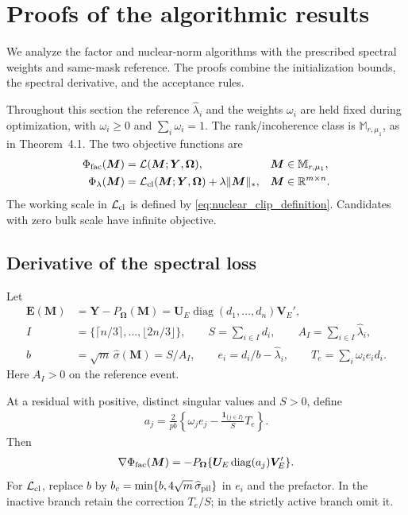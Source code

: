\documentclass[numsec,webpdf,modern,large,namedate]{oup-authoring-template}
\theoremstyle{plain}
\theoremstyle{remark}
\newcommand{\M}{\bm{M}}
\newcommand{\Y}{\bm{Y}}
\newcommand{\bOmega}{\bm{\Omega}}
\newcommand{\U}{\bm{U}}
\newcommand{\V}{\bm{V}}
\newif\ifmarkchanges
\newenvironment{revision}{\begingroup\ifmarkchanges\color{red}\fi}{\endgroup}
\begin{document}
\begin{revision}
\section{Proofs of the algorithmic results}
\label{sec:estimator_algorithms}

We analyze the factor and nuclear-norm algorithms with the prescribed
spectral weights and same-mask reference. The proofs combine the
initialization bounds, the spectral derivative, and the acceptance rules.

Throughout this section the reference $\widehat\lambda_i$ and the weights
$\omega_i$ are held fixed during optimization, with $\omega_i\ge0$ and
$\sum_i\omega_i=1$.  The rank/incoherence class is $\mathbb M_{r,\mu_1}$, as in Theorem~4.1.  The two objective functions are
\begin{align}
 \Phi_{\rm fac}(\M)&=\mathcal L(\M;\Y,\bOmega),
       &&\M\in\mathbb M_{r,\mu_1},\label{eq:of_factor_objective}\\
 \Phi_\lambda(\M)&=\mathcal L_{\rm cl}(\M;\Y,\bOmega)
                  +\lambda\|\M\|_*,
       &&\M\in\mathbb R^{m\times n}.\label{eq:of_nuclear_objective}
\end{align}
The working scale in $\mathcal L_{\rm cl}$ is defined by
\eqref{eq:nuclear_clip_definition}. Candidates with zero bulk scale have
infinite objective.

\subsection{Derivative of the spectral loss}
\label{sec:loss_derivative}
Let
\begin{align*}
 \bm E(\M)&=\Y-P_{\bOmega}(\M)
                =\U_E\operatorname{diag}(d_1,\ldots,d_n)\V_E',\\
 I&=\{\lceil n/3\rceil,\ldots,\lfloor2n/3\rfloor\},\qquad
 S=\sum_{i\in I}d_i,\qquad A_I=\sum_{i\in I}\widehat\lambda_i,\\
 b&=\sqrt m\,\widehat\sigma(\M)=S/A_I,
 \qquad e_i=d_i/b-\widehat\lambda_i,
 \qquad T_e=\sum_i\omega_i e_i d_i.
\end{align*}
Here $A_I>0$ on the reference event.

At a residual with positive, distinct singular values and $S>0$, define
\begin{align}
 a_j=\frac{2}{pb}
 \left\{\omega_j e_j-\frac{\mathbf1_{\{j\in I\}}}{S}T_e\right\}.
 \label{eq:of_spectral_derivative}
\end{align}
Then
\begin{align}
 \nabla\Phi_{\rm fac}(\M)
 =-P_{\bOmega}\{\U_E\operatorname{diag}(a_j)\V_E'\}.
 \label{eq:of_exact_matrix_gradient}
\end{align}
For $\mathcal L_{\rm cl}$, replace $b$ by
$b_c=\min\{b,4\sqrt m\,\widehat\sigma_{\rm pil}\}$ in $e_i$ and the
prefactor.  In the inactive branch retain the correction $T_e/S$; in the
strictly active branch omit it.


\end{revision}
\end{document}
